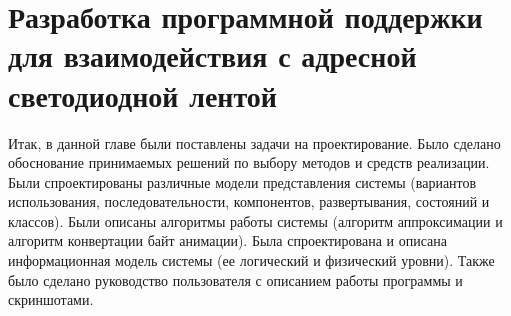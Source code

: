 \section{Разработка программной поддержки для взаимодействия с адресной светодиодной лентой}
\label{sec:develop}















Итак, в данной главе были поставлены задачи на проектирование. Было сделано обоснование принимаемых решений по выбору методов и средств реализации. Были спроектированы различные модели представления системы (вариантов использования, последовательности, компонентов, развертывания, состояний и классов). Были описаны алгоритмы работы системы (алгоритм аппроксимации и алгоритм конвертации байт анимации). Была спроектирована и описана информационная модель системы (ее логический и физический уровни). Также было сделано руководство пользователя с описанием работы программы и скриншотами.